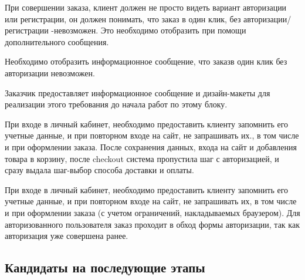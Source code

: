 {

\begin{wiki}
При совершении заказа, клиент должен не просто видеть вариант авторизации или регистрации, он должен понимать, что заказ в один клик, без авторизации/регистрации -невозможен. Это необходимо отобразить при помощи дополнительного сообщения.
\end{wiki}


\begin{itogo}
Необходимо отобразить информационное сообщение, что заказв один клик без авторизации невозможен.
\end{itogo}

Заказчик предоставляет информационное сообщение и дизайн-макеты для реализации этого требования до начала работ по этому блоку.


}

{

\begin{wiki}
При входе в личный кабинет, необходимо предоставить клиенту запомнить его учетные данные, и при повторном входе на сайт, не запрашивать их., в том числе и при оформлении заказа. После сохранения данных, входа на сайт и добавления товара в корзину, после checkout система пропустила шаг с авторизацией, и сразу выдала шаг-выбор способа доставки и оплаты. 
\end{wiki}


\begin{itogo}
При входе в личный кабинет, необходимо предоставить клиенту запомнить его учетные данные, и при повторном входе на сайт, не запрашивать их, в том числе и при оформлении заказа (с учетом ограничений, накладываемых браузером). 
Для авторизованного пользователя заказ проходит в обход формы авторизации, так как авторизация уже совершена ранее.
\end{itogo}

}

\ifcand
\subsection{Кандидаты на последующие этапы}
\fi

